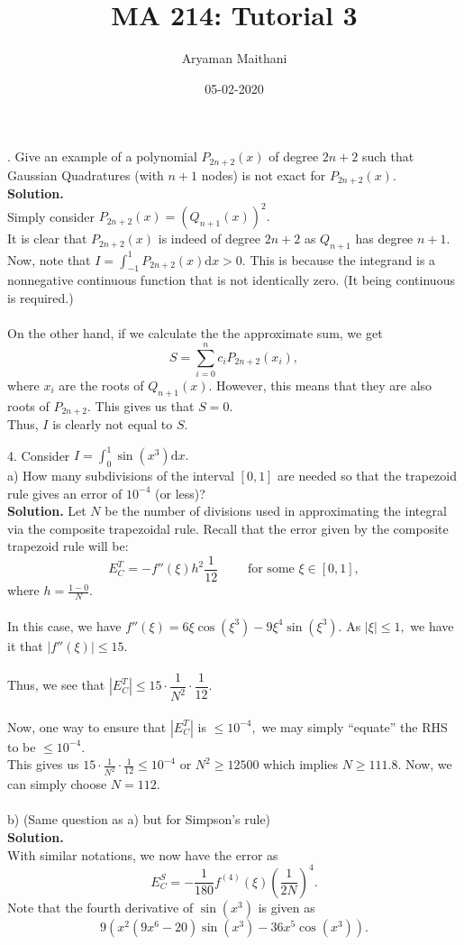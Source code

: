 \documentclass{article}
\title{MA 214: Tutorial 3}
\author{Aryaman Maithani}
\date{05-02-2020}
\begin{document}
. Give an example of a polynomial $P_{2n+2}(x)$ of degree $2n+2$ such that Gaussian Quadratures (with $n+1$ nodes) is not exact for $P_{2n+2}(x).$\\

\textbf{Solution.}\\
Simply consider $P_{2n+2}(x) = \left(Q_{n+1}(x)\right)^2.$\\
It is clear that $P_{2n+2}(x)$ is indeed of degree $2n+2$ as $Q_{n+1}$ has degree $n+1.$\\
Now, note that $I = \displaystyle\int_{-1}^{1} P_{2n+2}(x) \text{d}x > 0.$ This is because the integrand is a nonnegative continuous function that is not identically zero. (It being continuous is required.)\\~\\
On the other hand, if we calculate the the approximate sum, we get 
\[S = \sum_{i=0}^{n}c_iP_{2n+2}(x_i),\]
where $x_i$ are the roots of $Q_{n+1}(x).$ However, this means that they are also roots of $P_{2n+2}.$ This gives us that $S = 0.$\\
Thus, $I$ is clearly not equal to $S.$

\hrulefill

4. Consider $I = \displaystyle\int_{0}^{1} \sin\left(x^3\right) \text{d}x.$\\
a) How many subdivisions of the interval $[0, 1]$ are needed so that the trapezoid rule gives an error of $10^{-4}$ (or less)?\\
\textbf{Solution.} Let $N$ be the number of divisions used in approximating the integral via the composite trapezoidal rule. Recall that the error given by the composite trapezoid rule will be:
\[E_C^T = -f''(\xi)h^2\frac{1}{12} \qquad \text{ for some }\xi \in [0, 1],\]
where $h = \frac{1 - 0}{N}.$\\~\\
In this case, we have $f''(\xi) = 6\xi\cos(\xi^3) - 9\xi^4\sin(\xi^3).$ As $|\xi| \le 1,$ we have it that $|f''(\xi)| \le 15.$\\~\\
Thus, we see that $|E_C^T| \le 15\cdot\dfrac{1}{N^2}\cdot\dfrac{1}{12}.$\\~\\
Now, one way to ensure that $|E_C^T|$ is $\le 10^{-4},$ we may simply ``equate'' the RHS to be $\le 10^{-4}.$ \\
This gives us $15\cdot\frac{1}{N^2}\cdot\frac{1}{12} \le 10^{-4}$ or $N^2 \ge 12500$ which implies $N \ge 111.8.$ Now, we can simply choose $N = 112.$\\~\\
%
b) (Same question as a) but for Simpson's rule)\\
\textbf{Solution.}\\
With similar notations, we now have the error as
\[E_C^S = -\frac{1}{180}f^{(4)}(\xi)\left(\frac{1}{2N}\right)^4.\]
Note that the fourth derivative of $\sin(x^3)$ is given as
\[9(x^2(9x^6 - 20)\sin(x^3) - 36x^5\cos(x^3)).\]
\end{document}
